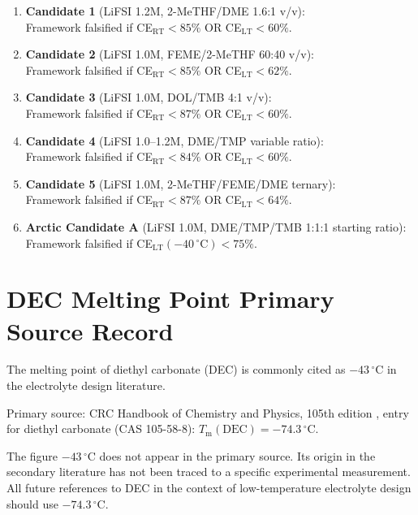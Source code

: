 \documentclass[11pt]{article}
\theoremstyle{plain}
\theoremstyle{definition}
\theoremstyle{remark}
\begin{document}
\begin{enumerate}[leftmargin=2em]
  \item \textbf{Candidate 1} (LiFSI 1.2M, 2-MeTHF/DME 1.6:1 v/v):\\
        Framework falsified if CE$_\mathrm{RT} < 85\%$ OR CE$_\mathrm{LT} < 60\%$.
  \item \textbf{Candidate 2} (LiFSI 1.0M, FEME/2-MeTHF 60:40 v/v):\\
        Framework falsified if CE$_\mathrm{RT} < 85\%$ OR CE$_\mathrm{LT} < 62\%$.
  \item \textbf{Candidate 3} (LiFSI 1.0M, DOL/TMB 4:1 v/v):\\
        Framework falsified if CE$_\mathrm{RT} < 87\%$ OR CE$_\mathrm{LT} < 60\%$.
  \item \textbf{Candidate 4} (LiFSI 1.0--1.2M, DME/TMP variable ratio):\\
        Framework falsified if CE$_\mathrm{RT} < 84\%$ OR CE$_\mathrm{LT} < 60\%$.
  \item \textbf{Candidate 5} (LiFSI 1.0M, 2-MeTHF/FEME/DME ternary):\\
        Framework falsified if CE$_\mathrm{RT} < 87\%$ OR CE$_\mathrm{LT} < 64\%$.
  \item \textbf{Arctic Candidate A} (LiFSI 1.0M, DME/TMP/TMB 1:1:1 starting ratio):\\
        Framework falsified if CE$_\mathrm{LT}(-40\,^{\circ}\text{C}) < 75\%$.
\end{enumerate}

\section{DEC Melting Point Primary Source Record}
\label{app:DEC}

The melting point of diethyl carbonate (DEC) is commonly cited as
$-43\,^{\circ}$C in the electrolyte design literature.

Primary source: CRC Handbook of Chemistry and Physics, 105th edition \cite{CRC2024},
entry for diethyl carbonate (CAS 105-58-8):
$T_\mathrm{m}(\mathrm{DEC}) = -74.3\,^{\circ}$C.

The figure $-43\,^{\circ}$C does not appear in the primary source.
Its origin in the secondary literature has not been traced to a specific
experimental measurement.  All future references to DEC in the context of
low-temperature electrolyte design should use $-74.3\,^{\circ}$C.
\end{document}

